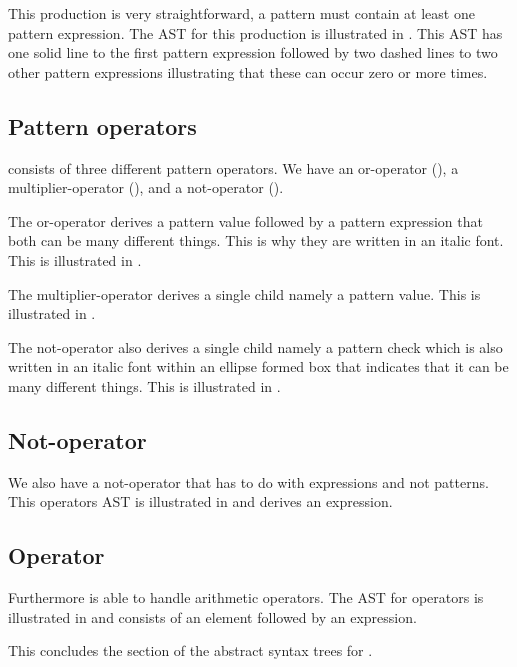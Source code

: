 \begin{ebnf}%
%
\end{ebnf}%

This production is very straightforward, a pattern must contain at least one pattern expression. The AST for this production is illustrated in . This AST has one solid line to the first pattern expression followed by two dashed lines to two other pattern expressions illustrating that these can occur zero or more times.%

%

\subsection{Pattern operators}%

\productname{} consists of three different pattern operators. We have an or-operator (), a multiplier-operator (), and a not-operator ().%

The or-operator derives a pattern value followed by a pattern expression that both can be many different things. This is why they are written in an italic font. This is illustrated in .%

%

The multiplier-operator derives a single child namely a pattern value. This is illustrated in .%

%

The not-operator also derives a single child namely a pattern check which is also written in an italic font within an ellipse formed box that indicates that it can be many different things. This is illustrated in .%

%

\subsection{Not-operator}%

We also have a not-operator that has to do with expressions and not patterns. This operators AST is illustrated in  and derives an expression.%

%

\subsection{Operator}%

Furthermore \productname{} is able to handle arithmetic operators. The AST for operators is illustrated in  and consists of an element followed by an expression.%

%

This concludes the section of the abstract syntax trees for \productname{}.%